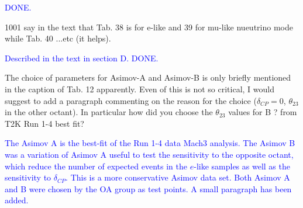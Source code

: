 \documentclass[final]{elsarticle}
\begin{document}
\textcolor{blue}{DONE.}

1001 say in the text that Tab. 38 is for e-like and 39 for mu-like nueutrino mode
while Tab. 40 ...etc (it helps).

\textcolor{blue}{Described in the text in section D. DONE.}

The choice of parameters for Asimov-A and Asimov-B is only briefly mentioned in
the caption of Tab. 12 apparently. Even of this is not so critical, I would suggest
to add a paragraph commenting on the reason for the choice ($\delta_{CP}=0$,
$\theta_{23}$ in the other octant). In particular how did you choose the $\theta_{23}$ values
for B ? from T2K Run 1-4 best fit?

\textcolor{blue}{The Asimov A is the best-fit of the Run 1-4 data Mach3 analysis.
The Asimov B was a variation of Asimov A useful to test the sensitivity to the opposite octant,
which reduce the number of expected events in the $e$-like samples as well as the 
sensitivity to $\delta_{CP}$. This is a more conservative Asimov data set.
Both Asimov A and B were chosen by the OA group as test points.
A small paragraph has been added.}
\end{document}
